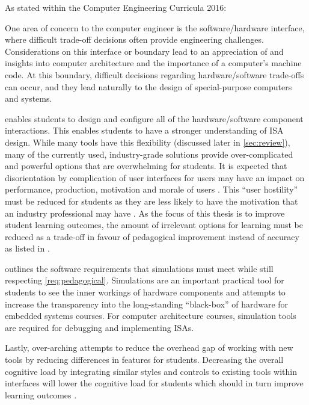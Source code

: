 As stated within the Computer Engineering Curricula 2016:
\begin{displayquote}
    One area of concern to the computer engineer is the software/hardware interface, where difficult trade-off decisions often provide engineering challenges. Considerations on this interface or boundary lead to an    appreciation of and insights into computer architecture and the importance of a computer’s machine code. At this boundary, difficult decisions regarding hardware/software trade-offs can occur, and they lead naturally to the design of special-purpose computers and systems.
\end{displayquote}
\noindent {} enables students to design and configure all of the hardware/software component interactions. This enables students to have a stronger understanding of ISA design. While many tools have this flexibility (discussed later in \cref{sec:review}), many of the currently used, industry-grade solutions provide over-complicated and powerful options that are overwhelming for students. It is expected that disorientation by complication of user interfaces for users may have an impact on performance, production, motivation and morale of users \cite{Chalmers2003}. This ``user hostility'' must be reduced for students as they are less likely to have the motivation that an industry professional may have \cite{Djordjevic2005}. As the focus of this thesis is to improve student learning outcomes, the amount of irrelevant options for learning must be reduced as a trade-off in favour of pedagogical improvement instead of accuracy as listed in . 

 outlines the software requirements that simulations must meet while still respecting \cref{req:pedagogical}. Simulations are an important practical tool for students to see the inner workings of hardware components and attempts to increase the transparency into the long-standing ``black-box'' of hardware for embedded systems courses. For computer architecture courses, simulation tools are required for debugging and implementing ISAs. 

Lastly, over-arching  attempts to reduce the overhead gap of working with new tools by reducing differences in features for students. Decreasing the overall cognitive load by integrating similar styles and controls to existing tools within interfaces will lower the cognitive load for students which should in turn improve learning outcomes \cite{Chalmers2003, Mavaddat1988}.

